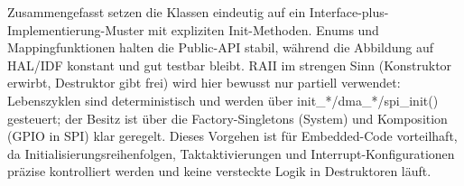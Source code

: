 Zusammengefasst setzen die Klassen eindeutig auf ein Interface-plus-Implementierung-Muster mit expliziten Init-Methoden. 
Enums und Mappingfunktionen halten die Public-API stabil, während die Abbildung auf HAL/IDF konstant und gut testbar bleibt. 
RAII im strengen Sinn (Konstruktor erwirbt, Destruktor gibt frei) wird hier bewusst nur partiell verwendet: \\
Lebenszyklen sind deterministisch und werden über init\_*/dma\_*/spi\_init() gesteuert; der Besitz ist über die Factory-Singletons (System) und Komposition (GPIO in SPI) klar geregelt. 
Dieses Vorgehen ist für Embedded-Code vorteilhaft, da Initialisierungsreihenfolgen, Taktaktivierungen und Interrupt-Konfigurationen präzise kontrolliert werden und keine versteckte Logik in Destruktoren läuft.
\\
\\



































